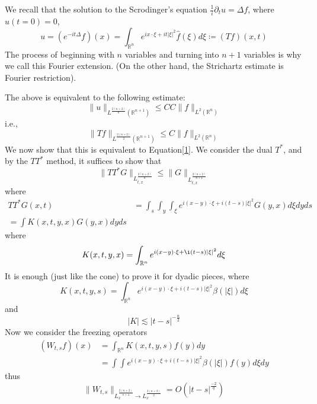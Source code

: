 \documentclass[openany]{book}
\newcommand{\R}{\mathbb{R}}
\begin{document}
We recall that the solution to the Scrodinger's equation $\frac{1}{i}\partial_tu=\Delta f$, where $u(t=0)=0$,
\begin{equation*}
    u=(e^{-it\Delta}f)(x)=\int_{\R^n}e^{ix\cdot\xi+it|\xi|^2}\hat{f}(\xi)d\xi\coloneq (Tf)(x,t)
\end{equation*}
The process of beginning with $n$ variables and turning into $n+1$ variables is why we call this Fourier extension. (On the other hand, the Strichartz estimate is Fourier restriction).

The above is equivalent to the following estimate:
\begin{equation*}
    \|u\|_{L^\frac{2(n+2)}{n}(\R^{n+1})}\leq CC\|f\|_{L^2(\R^n)}
\end{equation*}
i.e., 
\begin{equation*}
    \|Tf\|_{L^\frac{2(n+2)}{2}(\R^{n+1})}\leq C\|f\|_{L^2(\R^n)}
\end{equation*}
We now show that this is equivalent to Equation\ref{1}. We consider the dual $T^*$, and by the $TT^*$ method, it suffices to show that 
\begin{equation*}
    \|TT^*G\|_{L^\frac{2(n+2)}{n}_{t,x}}\leq \|G\|_{L_{t,x}^\frac{2(n+2)}{n+4}}
\end{equation*}
where 
\begin{align*}
    TT^*G(x,t)&=\int_s\int_y\int_\xi e^{i(x-y)\cdot\xi+i(t-s)|\xi|^2}G(y,x)d\xi dyds\\
    =\int K(x,t,y,x)G(y,x)dyds
\end{align*}
where 
\begin{equation*}
    K(x,t,y,x)=\int_{\R^n}e^{i(x-y)\cdot\xi+\i(t-s)|\xi|^2}d\xi
\end{equation*}
It is enough (just like the cone) to prove it for dyadic pieces, where 
\begin{equation*}
    K(x,t,y,s)=\int_{\R^n}e^{i(x-y)\cdot\xi+i(t-s)|\xi|^2}\beta(|\xi|)d\xi
\end{equation*}
and 
\begin{equation*}
    |K|\lesssim |t-s|^{-\frac{n}{2}}
\end{equation*}
Now we consider the freezing operators 
\begin{align*}
    (W_{t,s}f)(x)&=\int_{\R^n}K(x,t,y,s)f(y)dy\\
    &=\int\int e^{i(x-y)\cdot\xi+i(t-s)|\xi|^2}\beta(|\xi|)f(y)d\xi dy
\end{align*}
thus 
\begin{equation*}
    \|W_{t,s}\|_{L_x^\frac{2(n+2)}{n+4}\to L_x^\frac{2(n+2)}{2}}=O\left(|t-s|^\frac{-2}{q}\right)
\end{equation*}
\end{document}
